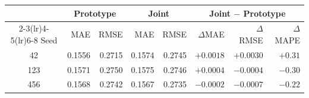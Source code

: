 \begingroup\color{revisionblue}
\sffamily\fontsize{9}{11}\selectfont\renewcommand{\arraystretch}{1.08}\setlength{\tabcolsep}{3pt}
\begin{tabular}{crrrrrrr}
\toprule
& \multicolumn{2}{c}{Prototype} & \multicolumn{2}{c}{Joint} & \multicolumn{3}{c}{Joint $-$ Prototype} \\
\cmidrule(lr){2-3}\cmidrule(lr){4-5}\cmidrule(lr){6-8}
Seed & MAE & RMSE & MAE & RMSE & $\Delta$MAE & $\Delta$RMSE & $\Delta$MAPE \\
\midrule
42 & 0.1556 & 0.2715 & 0.1574 & 0.2745 & $+0.0018$ & $+0.0030$ & $+0.31$ \\
123 & 0.1571 & 0.2750 & 0.1575 & 0.2746 & $+0.0004$ & $-0.0004$ & $-0.30$ \\
456 & 0.1568 & 0.2742 & 0.1567 & 0.2735 & $-0.0002$ & $-0.0007$ & $-0.22$ \\
\bottomrule
\end{tabular}
\endgroup
